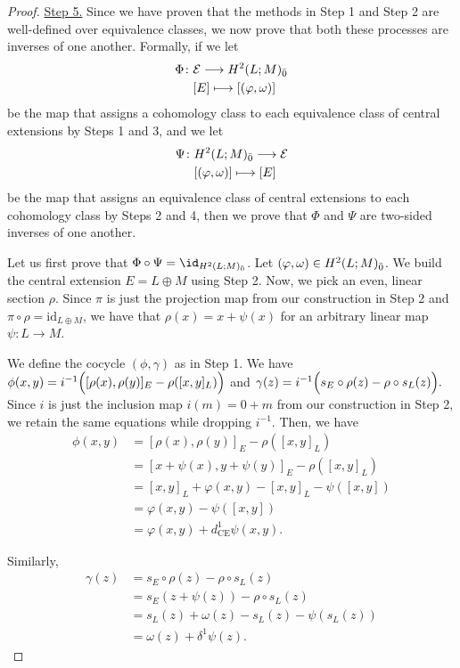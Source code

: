\documentclass[12pt]{amsart}
\newcommand {\ce}{{\text{CE}}}
\begin{document}
\begin{proof}
\noindent\underline{Step 5.} Since we have proven that the methods in Step 1 and Step 2 are well-defined over equivalence classes, we now prove that both these processes are inverses of one another. Formally, if we let 
\begin{align*}
\Phi \colon &\mathcal{E} \longrightarrow H^2(L;M)_{{\bar0}}\\
&[E] \longmapsto [(\varphi,\omega)]
\end{align*}
be the map that assigns a cohomology class to each equivalence class of central extensions by Steps 1 and 3, and we let
\begin{align*}
\Psi \colon &H^2(L;M)_{{\bar0}} \longrightarrow \mathcal{E}\\
&[(\varphi,\omega)] \longmapsto [E]
\end{align*}
be the map that assigns an equivalence class of central extensions to each cohomology class by Steps 2 and 4, then we prove that $\Phi$ and $\Psi$ are two-sided inverses of one another. 

\vspace{0.5 em}

Let us first prove that $\Phi \circ \Psi = \id_{H^2(L;M)_{\ev}}$. Let $(\varphi, \omega) \in H^2(L;M)_{{\bar0}}$.  We build the central extension $E=L \oplus M$ using Step 2. Now, we pick an even, linear section $\rho$. Since $\pi$ is just the projection map from our construction in Step 2 and $\pi \circ \rho = \mathrm{id}_{L \oplus M}$, we have that $\rho(x)=x+\psi(x)$ for an arbitrary linear map $\psi \colon L \longrightarrow M$.

We define the cocycle $(\phi, \gamma)$ as in Step 1. We have 
$\phi(x,y)=i^{-1}\Bigl([\rho(x),\rho(y)]_{E} -\rho([x,y]_{L})\Bigl)$ and $\gamma(z)=i^{-1}\Bigl(s_{E}\circ\rho(z)-\rho\circ s_{L}(z)\Bigl).$ Since $i$ is just the inclusion map $i(m)=0+m$ from our construction in Step 2, we retain the same equations while dropping $i^{-1}$. Then, we have
\begin{align*}
\phi(x,y)&=[\rho(x),\rho(y)]_{E} -\rho([x,y]_{L})\\
&=[x+\psi(x), y+\psi(y)]_{E}-\rho([x,y]_{L})\\
&=[x,y]_L+\varphi(x,y)-[x,y]_{L}-\psi([x,y])\\
&=\varphi(x,y)-\psi([x,y])\\
&=\varphi(x,y)+d_{\ce}^1\psi(x,y).
\end{align*}

Similarly,
\begin{align*}
\gamma(z)&=s_{E}\circ \rho(z)-\rho \circ s_{L}(z)\\
&= s_{E}(z+\psi(z))-\rho \circ s_{L}(z)\\
&=s_L(z)+\omega(z)-s_L(z)-\psi(s_L(z))\\
&=\omega(z)+\delta^1\psi(z).
\end{align*}


\end{proof}
\end{document}
